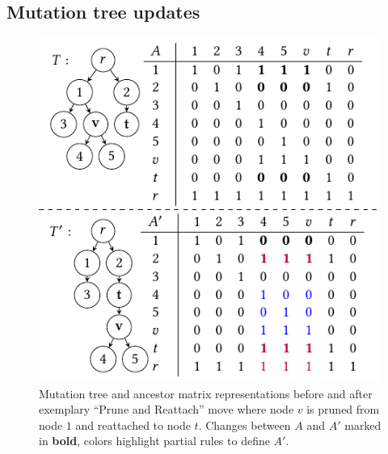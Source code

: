 \subsection{Mutation tree updates}
\label{subsec:tree_updates}

\begin{figure}[tbh]
    \includegraphics{figures/prune_reattach.pdf}
    \caption{Mutation tree and ancestor matrix representations before and after exemplary ``Prune and Reattach'' move where node $v$ is pruned from node $1$ and reattached to node $t$. Changes between $A$ and $A'$ marked in \textbf{bold}, \textcolor{emph}{colors} \textcolor{emph2}{highlight} partial rules to define $A'$.}
    \label{fig:prune_reattach}
\end{figure}

